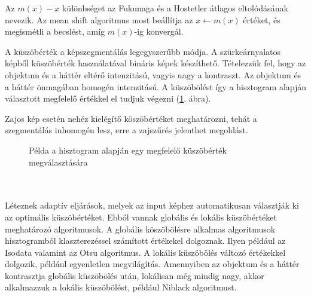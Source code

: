 Az $m (x) -x$ különbséget az Fukunaga és a Hostetler átlagos eltolódásának nevezik. Az mean shift algoritmus most beállítja az $x \leftarrow m(x)$ értéket, és megismétli a becslést, amíg $m(x)$-ig konvergál.



A küszöbérték a képszegmentálás legegyszerűbb módja. A szürkeárnyalatos képből küszöbérték használatával bináris képek készíthető. Tételezzük fel, hogy az objektum és a háttér eltérő intenzitású, vagyis nagy a kontraszt. Az objektum és a háttér önmagában homogén intenzitású. A küszöbölést így a hisztogram alapján választott megfelelő értékkel el tudjuk végezni (\ref{fig:threshold}. ábra).

Zajos kép esetén nehéz kielégítő köszöbértéket meghatározni, tehát a szegmentálás inhomogén lesz, erre a zajszűrés jelenthet megoldást.


\begin{figure}[ht]
\centering
{}
\caption{Példa a hisztogram alapján egy megfelelő küszöbérték megválasztására} 
\label{fig:threshold}
\end{figure}


\\\\
Léteznek adaptív eljárások, melyek az input képhez automatikusan választják ki az optimális küszöbértéket. Ebből vannak globális és lokális küszöbértéket meghatározó algoritmusok. A globális köszöbölésre alkalmas algoritmusok hisztogramból klaszterezéssel számított értékekel dolgoznak. Ilyen például az Isodata valamint az Otsu algoritmus. A lokális küszöbölés változó értékekkel dolgozik, például egyenletlen megvilágítás. Amennyiben az objektum és a háttér kontrasztja globális küszöbölés után, lokálisan még mindig nagy, akkor alkalmazzuk a lokális küszöbölést, például Niblack algoritmust.

